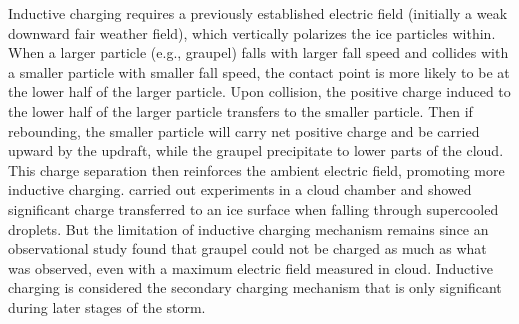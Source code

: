 Inductive charging requires a previously established electric field (initially a weak downward fair weather field), which vertically polarizes the ice particles within. When a larger particle (e.g., graupel) falls with larger fall speed and collides with a smaller particle with smaller fall speed, the contact point is more likely to be at the lower half of the larger particle. Upon collision, the positive charge induced to the lower half of the larger particle transfers to the smaller particle. Then if rebounding, the smaller particle will carry net positive charge and be carried upward by the updraft, while the graupel precipitate to lower parts of the cloud. This charge separation then reinforces the ambient electric field, promoting more inductive charging. \cite{brooks1994experimental} carried out experiments in a cloud chamber and showed significant charge transferred to an ice surface when falling through supercooled droplets. But the limitation of inductive charging mechanism remains since an observational study \cite{christian1980airborne} found that graupel could not be charged as much as what was observed, even with a maximum electric field measured in cloud. Inductive charging is considered the secondary charging mechanism that is only significant during later stages of the storm.

